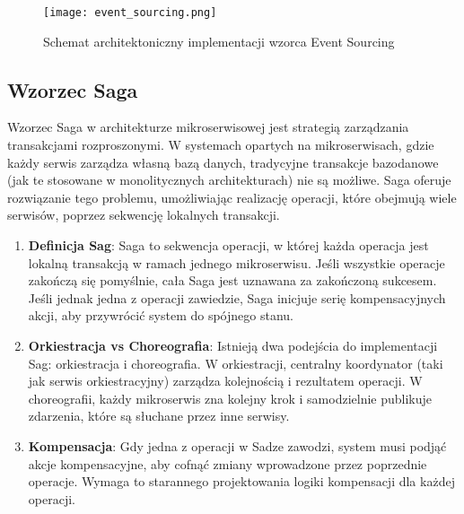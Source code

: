 \begin{figure}[!h]
    \centering \texttt{[image: event\_sourcing.png]}
    \caption{Schemat architektoniczny implementacji wzorca Event Sourcing}
\end{figure}

\subsection{Wzorzec Saga}

Wzorzec Saga w architekturze mikroserwisowej jest strategią zarządzania transakcjami rozproszonymi. W systemach opartych na mikroserwisach, gdzie każdy serwis zarządza własną bazą danych, tradycyjne transakcje bazodanowe (jak te stosowane w monolitycznych architekturach) nie są możliwe. Saga oferuje rozwiązanie tego problemu, umożliwiając realizację operacji, które obejmują wiele serwisów, poprzez sekwencję lokalnych transakcji.

\begin{enumerate}

    \item \textbf{Definicja Sag}: Saga to sekwencja operacji, w której każda operacja jest lokalną transakcją w ramach jednego mikroserwisu. Jeśli wszystkie operacje zakończą się pomyślnie, cała Saga jest uznawana za zakończoną sukcesem. Jeśli jednak jedna z operacji zawiedzie, Saga inicjuje serię kompensacyjnych akcji, aby przywrócić system do spójnego stanu.

    \item \textbf{Orkiestracja vs Choreografia}: Istnieją dwa podejścia do implementacji Sag: orkiestracja i choreografia. W orkiestracji, centralny koordynator (taki jak serwis orkiestracyjny) zarządza kolejnością i rezultatem operacji. W choreografii, każdy mikroserwis zna kolejny krok i samodzielnie publikuje zdarzenia, które są słuchane przez inne serwisy.

    \item \textbf{Kompensacja}: Gdy jedna z operacji w Sadze zawodzi, system musi podjąć akcje kompensacyjne, aby cofnąć zmiany wprowadzone przez poprzednie operacje. Wymaga to starannego projektowania logiki kompensacji dla każdej operacji.

\end{enumerate}
